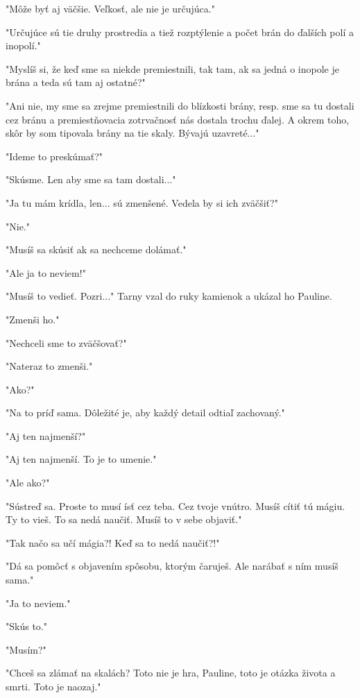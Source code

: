 \documentclass{book}
\begin{document}
"$ $Môže byť aj väčšie. Veľkosť, ale nie je určujúca."$ $ 

"$ $Určujúce sú tie druhy prostredia a tiež rozptýlenie a počet brán do ďalších polí a inopolí."$ $ 

"$ $Myslíš si, že keď sme sa niekde premiestnili, tak tam, ak sa jedná o inopole je brána a teda sú tam aj ostatné?"$ $ 

"$ $Ani nie, my sme sa zrejme premiestnili do blízkosti brány, resp. sme sa tu dostali cez bránu a premiestňovacia zotrvačnosť nás dostala trochu ďalej. A okrem toho, skôr by som tipovala brány na tie skaly. Bývajú uzavreté..."$ $ 

"$ $Ideme to preskúmať?"$ $ 

"$ $Skúsme. Len aby sme sa tam dostali..."$ $ 

"$ $Ja tu mám krídla, len... sú zmenšené. Vedela by si ich zväčšiť?"$ $ 

"$ $Nie."$ $ 

"$ $Musíš sa skúsiť ak sa nechceme dolámať."$ $ 

"$ $Ale ja to neviem!"$ $ 

"$ $Musíš to vedieť. Pozri..."$ $  Tarny vzal do ruky kamienok a ukázal ho Pauline.

"$ $Zmenši ho."$ $ 

"$ $Nechceli sme to zväčšovať?"$ $ 

"$ $Nateraz to zmenši."$ $ 

"$ $Ako?"$ $ 

"$ $Na to príď sama. Dôležité je, aby každý detail odtiaľ zachovaný."$ $ 

"$ $Aj ten najmenší?"$ $ 

"$ $Aj ten najmenší. To je to umenie."$ $ 

"$ $Ale ako?"$ $ 

"$ $Sústreď sa. Proste to musí ísť cez teba. Cez tvoje vnútro. Musíš cítiť tú mágiu. Ty to vieš. To sa nedá naučiť. Musíš to v sebe objaviť."$ $ 

"$ $Tak načo sa učí mágia?! Keď sa to nedá naučiť?!"$ $ 

"$ $Dá sa pomôcť s objavením spôsobu, ktorým čaruješ. Ale narábať s ním musíš sama."$ $ 

"$ $Ja to neviem."$ $ 

"$ $Skús to."$ $ 

"$ $Musím?"$ $ 

"$ $Chceš sa zlámať na skalách? Toto nie je hra, Pauline, toto je otázka života a smrti. Toto je naozaj."$ $ 
\end{document}
